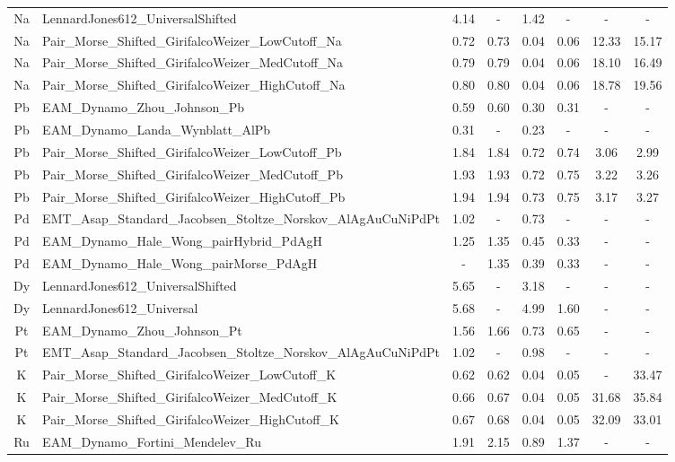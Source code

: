 \documentclass[%
 reprint,
 amsmath,amssymb,
 aps,
]{revtex4-1}
\begin{document}
\begin{longtable*}{@{\extracolsep{\fill}} c l c c c c c c}
 Na & LennardJones612\_UniversalShifted & 4.14 & - & 1.42 & - & - & - \\
 Na & Pair\_Morse\_Shifted\_GirifalcoWeizer\_LowCutoff\_Na & 0.72 & 0.73 & 0.04 & 0.06 & 12.33 & 15.17 \\
 Na & Pair\_Morse\_Shifted\_GirifalcoWeizer\_MedCutoff\_Na & 0.79 & 0.79 & 0.04 & 0.06 & 18.10 & 16.49 \\
 Na & Pair\_Morse\_Shifted\_GirifalcoWeizer\_HighCutoff\_Na & 0.80 & 0.80 & 0.04 & 0.06 & 18.78 & 19.56 \\
 Pb & EAM\_Dynamo\_Zhou\_Johnson\_Pb & 0.59 & 0.60 & 0.30 & 0.31 & - & - \\
 Pb & EAM\_Dynamo\_Landa\_Wynblatt\_AlPb & 0.31 & - & 0.23 & - & - & - \\
 Pb & Pair\_Morse\_Shifted\_GirifalcoWeizer\_LowCutoff\_Pb & 1.84 & 1.84 & 0.72 & 0.74 & 3.06 & 2.99 \\
 Pb & Pair\_Morse\_Shifted\_GirifalcoWeizer\_MedCutoff\_Pb & 1.93 & 1.93 & 0.72 & 0.75 & 3.22 & 3.26 \\
 Pb & Pair\_Morse\_Shifted\_GirifalcoWeizer\_HighCutoff\_Pb & 1.94 & 1.94 & 0.73 & 0.75 & 3.17 & 3.27 \\
 Pd & EMT\_Asap\_Standard\_Jacobsen\_Stoltze\_Norskov\_AlAgAuCuNiPdPt & 1.02 & - & 0.73 & - & - & - \\
 Pd & EAM\_Dynamo\_Hale\_Wong\_pairHybrid\_PdAgH & 1.25 & 1.35 & 0.45 & 0.33 & - & - \\
 Pd & EAM\_Dynamo\_Hale\_Wong\_pairMorse\_PdAgH & - & 1.35 & 0.39 & 0.33 & - & - \\
 Dy & LennardJones612\_UniversalShifted & 5.65 & - & 3.18 & - & - & - \\
 Dy & LennardJones612\_Universal & 5.68 & - & 4.99 & 1.60 & - & - \\
 Pt & EAM\_Dynamo\_Zhou\_Johnson\_Pt & 1.56 & 1.66 & 0.73 & 0.65 & - & - \\
 Pt & EMT\_Asap\_Standard\_Jacobsen\_Stoltze\_Norskov\_AlAgAuCuNiPdPt & 1.02 & - & 0.98 & - & - & - \\
 K & Pair\_Morse\_Shifted\_GirifalcoWeizer\_LowCutoff\_K & 0.62 & 0.62 & 0.04 & 0.05 & - & 33.47 \\
 K & Pair\_Morse\_Shifted\_GirifalcoWeizer\_MedCutoff\_K & 0.66 & 0.67 & 0.04 & 0.05 & 31.68 & 35.84 \\
 K & Pair\_Morse\_Shifted\_GirifalcoWeizer\_HighCutoff\_K & 0.67 & 0.68 & 0.04 & 0.05 & 32.09 & 33.01 \\
 Ru & EAM\_Dynamo\_Fortini\_Mendelev\_Ru & 1.91 & 2.15 & 0.89 & 1.37 & - & - \\

\end{longtable*}
\end{document}
